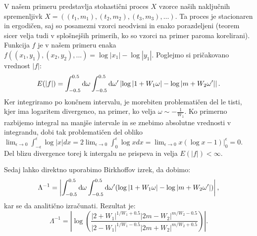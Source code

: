 V našem primeru predstavlja stohastični proces $X$ vzorce naših naključnih spremenljivk $X=((t_1,m_1),(t_2,m_2),(t_3,m_3), \dots)$. Ta proces je stacionaren in ergodičen, saj so posamezni vzorci neodvisni in enako porazdeljeni \cite{birkhoff} (teorem sicer velja tudi v splošnejših primerih, ko so vzorci na primer paroma korelirani).
Funkcija $f$ je v našem primeru enaka  $f((x_1,y_1),( x_2, y_2), ...) = \log |x_1| - \log |y_1|$.
Poglejmo si pričakovano vrednost $|f|$:
\begin{equation}
E(|f|) = \int_{-0.5}^{0.5} \textup{d} \omega \int_{-0.5}^{0.5} \textup{d} \omega^\prime \left| \log | 1 + W_1 \omega | - \log | m + W_2 \omega^\prime | \right|.
\end{equation}
Ker integriramo po končnem intervalu, je morebiten problematičen del le tisti, kjer ima logaritem divergenco, na primer, ko velja $\omega \sim -\frac{1}{W_1}$. Ko primerno razbijemo integral na manjše intervale in se znebimo absolutne vrednosti v integrandu, dobi tak problematičen del obliko $\lim_{\epsilon \to 0} \int_{- \epsilon}^\epsilon \log |x| dx =  2 \lim_{\epsilon \to 0} \int_{0}^\epsilon \log x dx = \lim_{\epsilon \to 0} x (\log x - 1) \rvert_0^\epsilon = 0$. Del blizu divergence torej k intergalu ne prispeva in velja $E(|f|) < \infty$.

Sedaj lahko direktno uporabimo Birkhoffov izrek, da dobimo:
\begin{equation}
\Lambda^{-1} = \left| \int_{-0.5}^{0.5} \textup{d} \omega \int_{-0.5}^{0.5} \textup{d} \omega^\prime ( \log | 1 + W_1 \omega | - \log | m + W_2 \omega^\prime | ) \right|,
\end{equation}
kar se da analitično izračunati. Rezultat je:
\begin{equation} \label{analiticnalok}
\Lambda^{-1} = \left| \log( \frac{|2+W_1|^{1/W_1 + 0.5} |2m - W_2|^{m/W_2 -0.5}}{|2-W_1|^{1/W_1-0.5} |2m + W_2|^{m/W_2 + 0.5}})\right|.
\end{equation}

